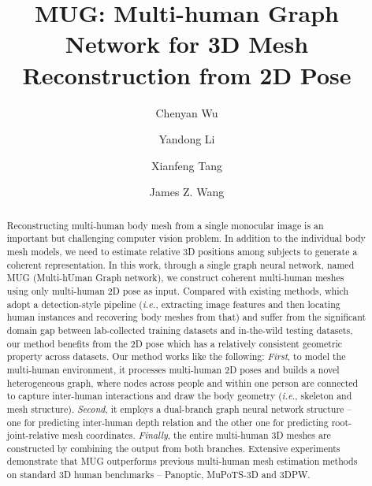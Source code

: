 \documentclass[runningheads]{llncs}
\begin{document}
\pagestyle{headings}
\mainmatter
\def\ECCVSubNumber{}  

\title{MUG: Multi-human Graph Network for 3D Mesh Reconstruction from 2D Pose} 

\begin{comment}
\end{comment}


\author{Chenyan Wu \and
Yandong Li \and
Xianfeng Tang \and
James Z. Wang}
\maketitle

\begin{abstract}
 Reconstructing multi-human body mesh from a single monocular image is an important but challenging computer vision problem. 
 In addition to the individual body mesh models, we need to estimate relative 3D positions among subjects to generate a coherent representation. 
 In this work, through a single graph neural network, named MUG (Multi-hUman Graph network), we construct coherent multi-human meshes using only multi-human 2D pose as input.
Compared with existing methods, which adopt a detection-style pipeline ({\it i.e.}, extracting image features and then locating human instances and recovering body meshes from that) and suffer from the significant domain gap between lab-collected training datasets and in-the-wild testing datasets, our method benefits from the 2D pose which has a relatively consistent geometric property across datasets.
Our method works like the following:
 \textit{First}, to model the multi-human environment, it processes multi-human 2D poses and builds a novel heterogeneous graph, where nodes across people and within one person are connected to capture inter-human interactions and draw the body geometry ({\it i.e.}, skeleton and mesh structure).
 \textit{Second}, it employs a dual-branch graph neural network structure -- one for predicting inter-human depth relation and the other one for predicting root-joint-relative mesh coordinates.  
 \textit{Finally}, the entire multi-human 3D meshes are constructed by combining the output from both branches. 
 Extensive experiments demonstrate that MUG outperforms previous multi-human mesh estimation methods on standard 3D human benchmarks -- Panoptic, MuPoTS-3D and 3DPW.
\end{abstract}
\end{document}
